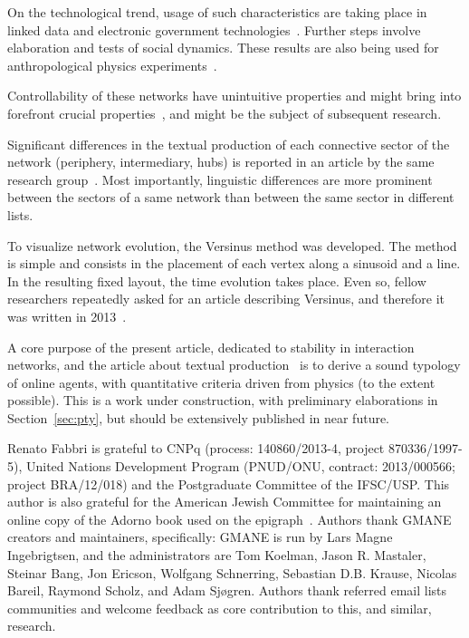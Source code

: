 \documentclass[%
 aip,
 jmp,%
 amsmath,amssymb,
 reprint,%
]{revtex4-1}
\begin{document}
On the technological trend, usage of such characteristics are taking place in linked data and electronic government technologies~\cite{ops,opa,ensaio}. Further steps involve elaboration and tests of social dynamics. These results are also being used for anthropological physics experiments~\cite{anPhy}.

Controllability of these networks have unintuitive properties and might bring into forefront crucial properties~\cite{barabasiControlCapacity,barabasiControlCentrality,barabasiControllability}, and might be the subject of subsequent research.

Significant differences in the textual production of each connective sector of the network (periphery, intermediary, hubs) is reported in an article by the same research group~\cite{rcText}. Most importantly, linguistic differences are more prominent between the sectors of a same network than between the same sector in different lists. 

To visualize network evolution, the Versinus method was developed. The method is simple and consists in the placement of each vertex along a sinusoid and a line. In the resulting fixed layout, the time evolution takes place.  Even so, fellow researchers repeatedly asked for an article describing Versinus, and therefore it was written in 2013~\cite{versinus}.

A core purpose of the present article, dedicated to stability in interaction networks, and the article about textual production~\cite{rcText} is to derive a sound typology of online agents, with quantitative criteria driven from physics (to the extent possible). This is a work under construction, with preliminary elaborations in Section~\ref{sec:pty}, but should be extensively published in near future.





\begin{acknowledgments}
Renato Fabbri is grateful to CNPq (process: 140860/2013-4,
project 870336/1997-5), United Nations Development Program (PNUD/ONU, contract: 2013/000566; project BRA/12/018)  and 
the Postgraduate Committee of the IFSC/USP. This author is also grateful for
the American Jewish Committee for maintaining an online copy of the Adorno book
used on the epigraph~\cite{adorno}. Authors thank GMANE creators and maintainers, specifically: GMANE is run by Lars Magne Ingebrigtsen, and the administrators are Tom Koelman, Jason R. Mastaler, Steinar Bang, Jon Ericson, Wolfgang Schnerring, Sebastian D.B. Krause, Nicolas Bareil, Raymond Scholz, and Adam Sjøgren. Authors thank referred email lists communities and welcome feedback as core contribution to this, and similar, research.
\end{acknowledgments}
\end{document}
